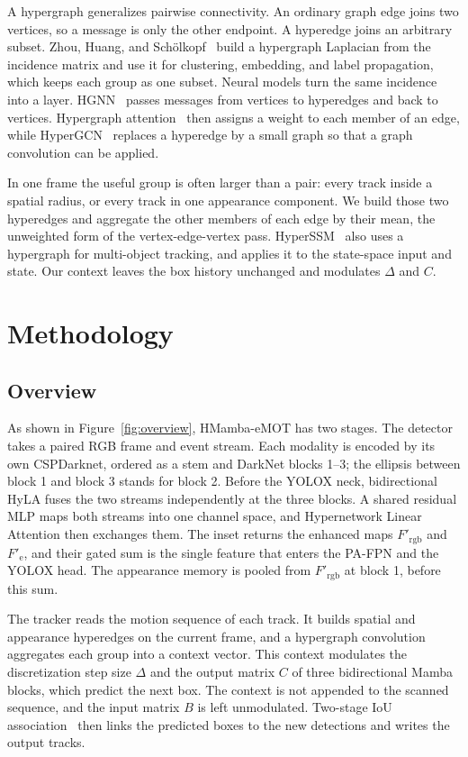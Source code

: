 \documentclass[10pt,twocolumn,letterpaper]{article}
\begin{document}
A hypergraph generalizes pairwise connectivity. An ordinary graph edge joins two vertices, so a message is only the other endpoint. A hyperedge joins an arbitrary subset. Zhou, Huang, and Sch\"olkopf~\cite{zhou2006hypergraph} build a hypergraph Laplacian from the incidence matrix and use it for clustering, embedding, and label propagation, which keeps each group as one subset. Neural models turn the same incidence into a layer. HGNN~\cite{feng2019hgnn} passes messages from vertices to hyperedges and back to vertices. Hypergraph attention~\cite{bai2021hypergraph} then assigns a weight to each member of an edge, while HyperGCN~\cite{yadati2019hypergcn} replaces a hyperedge by a small graph so that a graph convolution can be applied.

In one frame the useful group is often larger than a pair: every track inside a spatial radius, or every track in one appearance component. We build those two hyperedges and aggregate the other members of each edge by their mean, the unweighted form of the vertex-edge-vertex pass. HyperSSM~\cite{song2026hyperssm} also uses a hypergraph for multi-object tracking, and applies it to the state-space input and state. Our context leaves the box history unchanged and modulates $\Delta$ and $C$.




\section{Methodology}

\subsection{Overview}

As shown in Figure~\ref{fig:overview}, HMamba-eMOT has two stages. The detector takes a paired RGB frame and event stream. Each modality is encoded by its own CSPDarknet, ordered as a stem and DarkNet blocks 1--3; the ellipsis between block 1 and block 3 stands for block 2. Before the YOLOX neck, bidirectional HyLA fuses the two streams independently at the three blocks. A shared residual MLP maps both streams into one channel space, and Hypernetwork Linear Attention then exchanges them. The inset returns the enhanced maps $F'_{\mathrm{rgb}}$ and $F'_{\mathrm{e}}$, and their gated sum is the single feature that enters the PA-FPN and the YOLOX head. The appearance memory is pooled from $F'_{\mathrm{rgb}}$ at block 1, before this sum.

The tracker reads the motion sequence of each track. It builds spatial and appearance hyperedges on the current frame, and a hypergraph convolution aggregates each group into a context vector. This context modulates the discretization step size $\Delta$ and the output matrix $C$ of three bidirectional Mamba blocks, which predict the next box. The context is not appended to the scanned sequence, and the input matrix $B$ is left unmodulated. Two-stage IoU association~\cite{zhang2022bytetrack} then links the predicted boxes to the new detections and writes the output tracks.
\end{document}
